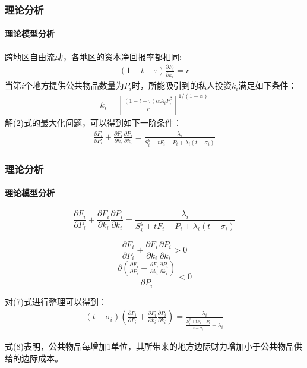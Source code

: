 
\begin{frame}[t]
	\frametitle{理论分析}
	\framesubtitle{理论模型分析}
	\begin{small}
		跨地区自由流动，各地区的资本净回报率都相同:
		\begin{align}
		(1-t-\tau) \frac{\partial F_i}{\partial k_i} = r
		\end{align}
		当第$i$个地方提供公共物品数量为$P_i$时，所能吸引到的私人投资$k_i$满足如下条件：
		\begin{align}
		k_i = [\frac{(1-t-\tau)\alpha A_i P_i^\beta}{r}]^{1/(1-\alpha)}
		\end{align}
		解(2)式的最大化问题，可以得到如下一阶条件：
		\begin{align}
		\frac{\partial F_i}{\partial P_i}+\frac{\partial F_i}{\partial k_i} \frac{\partial P_i}{\partial k_i} =\frac{\lambda_i}{S_i^g+tF_i-P_i+\lambda_i(t-\sigma_i)}
		\end{align}
	\end{small}
\end{frame}


\begin{frame}[t]
	\frametitle{理论分析}
	\framesubtitle{理论模型分析}
	\begin{small}
		\[
				\frac{\partial F_i}{\partial P_i}+\frac{\partial F_i}{\partial k_i} \frac{\partial P_i}{\partial k_i} =\frac{\lambda_i}{S_i^g+tF_i-P_i+\lambda_i(t-\sigma_i)}
		\]
		
		\[
			\frac{\partial F_i}{\partial P_i}+\frac{\partial F_i}{\partial k_i} \frac{\partial P_i}{\partial k_i}>0
			\]
		\[	\frac{\partial (\frac{\partial F_i}{\partial P_i}+\frac{\partial F_i}{\partial k_i} \frac{\partial P_i}{\partial k_i})}{\partial P_i}<0
		\]
		
		对(7)式进行整理可以得到：
		\begin{align}
		(t-\sigma_i)(\frac{\partial F_i}{\partial P_i}+\frac{\partial F_i}{\partial k_i} \frac{\partial P_i}{\partial k_i}) = \frac{\lambda_i}{\frac{S_i^g+tF_i-P_i}{t-\sigma_i}+\lambda_i}
		\end{align}
		
		式(8)表明，公共物品每增加1单位，其所带来的地方边际财力增加小于公共物品供给的边际成本。
	\end{small}
\end{frame}

